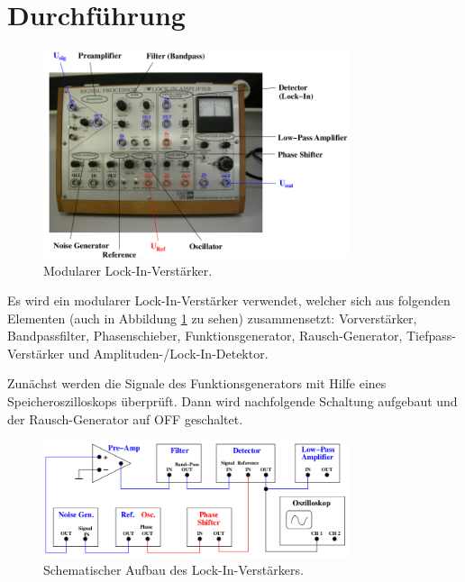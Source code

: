 \newpage
\section{Durchführung}
\label{sec:Durchführung}
\begin{figure}
  \centering
  \includegraphics[width=0.8\textwidth]{verstaerker.png}
  \caption{Modularer Lock-In-Verstärker.}
  \label{fig:verstaerker}
\end{figure}

{Es wird ein modularer Lock-In-Verstärker verwendet, welcher sich aus} folgenden
Elementen (auch in Abbildung \ref{fig:verstaerker} zu sehen) zusammensetzt:
Vorverstärker, Bandpassfilter, Phasenschieber, Funktionsgenerator, Rausch-Generator,
Tiefpass-Verstärker und Amplituden-/Lock-In-Detektor.

Zunächst werden die Signale des Funktionsgenerators mit Hilfe eines Speicheroszilloskops
überprüft. Dann wird nachfolgende Schaltung aufgebaut und der Rausch-Generator auf
OFF geschaltet.
\begin{figure}
  \centering
  \includegraphics[width=0.8\textwidth]{schaltung.png}
  \caption{Schematischer Aufbau des Lock-In-Verstärkers.}
  \label{fig:schaltung}
\end{figure}

